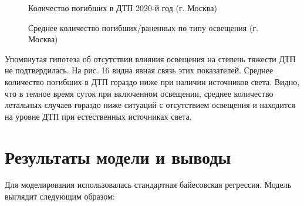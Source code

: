 \documentclass[a4paper, 14pt]{article}
\begin{document}
\begin{figure}[h]
	\caption{Количество погибших в ДТП 2020-й год (г. Москва)}
\end{figure}


\begin{figure}[h]
	\caption{Среднее количество погибших/раненных по типу освещения (г. Москва)}
\end{figure}



Упомянутая гипотеза об отсутствии влияния освещения на степень тяжести ДТП не подтвердилась. На рис. 16 видна явная связь этих показателей. Среднее количество погибших в ДТП гораздо ниже при наличии источников света. Видно, что в темное время суток при включенном освещении, среднее количество летальных случаев гораздо ниже ситуаций с отсутствием освещения и находится на уровне ДТП при естественных источниках света.

\section{Результаты модели и выводы}

Для моделирования использовалась стандартная байесовская регрессия. Модель выглядит следующим образом:
\end{document}
